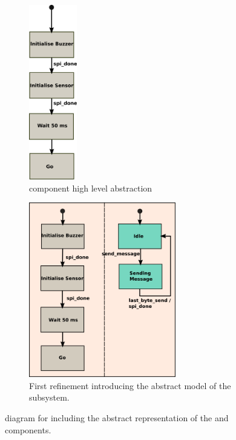\begin{figure}[t!]
	    \begin{subfigure}[t]{0.3\textwidth}
	        \begin{centering}
	        \includegraphics[height=3in]{figures/ASIC}
	        \caption{\ASIC component high level abstraction}
	        \label{fig:ASIC}
	        \end{centering}
	    \end{subfigure}
\qquad
	    \begin{subfigure}[t]{0.5\textwidth}
	        \includegraphics[height=3in]{figures/ASIC&SPI_1}
	        \caption{First refinement introducing the abstract model of the \SPI subsystem.}
	        \label{fig:ASIC_SPI_1}
	    \end{subfigure}
	    \caption{\Statechart diagram for \IDS including the abstract representation of the \ASIC and \SPI components.}
\end{figure}

